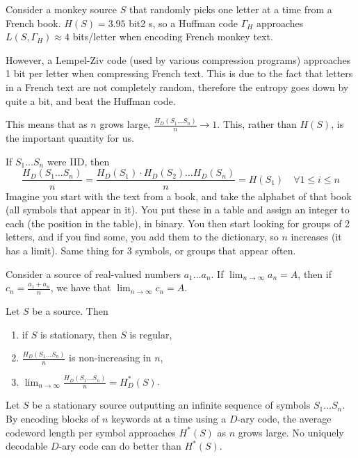 \documentclass{report}
\begin{document}
\begin{exmp}
	Consider a monkey source $S$ that randomly picks one letter at a time from a French book. $H(S) = 3.95$ bit2	s, so a Huffman code $\Gamma_H$ approaches $L(S, \Gamma_H) \approx 4$ bits/letter when encoding French monkey text. \par 
	However, a Lempel-Ziv code (used by various compression programs) approaches 1 bit per letter when compressing French text. This is due to the fact that letters in a French text are not completely random, therefore the entropy goes down by quite a bit, and beat the Huffman code. \par
	This means that as $n$ grows large, $\frac{H_D(S_1 \ldots S_n)}{n} \to 1$. This, rather than $H(S)$, is the important quantity for us. \par
	If $S_1 \ldots S_n$ were IID, then
	\begin{equation*}
		\frac{H_D(S_1 \ldots S_n)}{n} = \frac{H_D(S_1) \cdot H_D(S_2) \ldots H_D(S_n)}{n} = H(S_1) \quad \forall 1 \leq i \leq n
	\end{equation*}
	Imagine you start with the text from a book, and take the alphabet of that book (all symbols that appear in it). You put these in a table and assign an integer to each (the position in the table), in binary. You then start looking for groups of 2 letters, and if you find some, you add them to the dictionary, so $n$ increases (it has a limit). Same thing for 3 symbols, or groups that appear often. 
\end{exmp}

\begin{thm}
	Consider a source of real-valued numbers $a_1 \ldots a_n$. If $\lim_{n \to \infty} a_n = A$, then if $c_n = \frac{a_1 + a_n}{n}$, we have that $\lim_{n \to \infty} c_n = A$.
\end{thm}

\begin{thm} Let $S$ be a source. Then
	\begin{enumerate}
		\item if $S$ is stationary, then $S$ is regular,
		\item $\frac{H_D(S_1 \ldots S_n)}{n}$ is non-increasing in $n$,
		\item $\lim_{n \to \infty} \frac{H_D(S_1 \ldots S_n)}{n} = H_D^*(S)$.
	\end{enumerate}
\end{thm}

\begin{summary}
	Let $S$ be a stationary source outputting an infinite sequence of symbols $S_1 \ldots S_n$. By encoding blocks of $n$ keywords at a time using a $D$-ary code, the average codeword length per symbol approaches $H^*(S)$ as $n$ grows large. No uniquely decodable $D$-ary code can do better than $H^*(S)$.
\end{summary}
\end{document}
